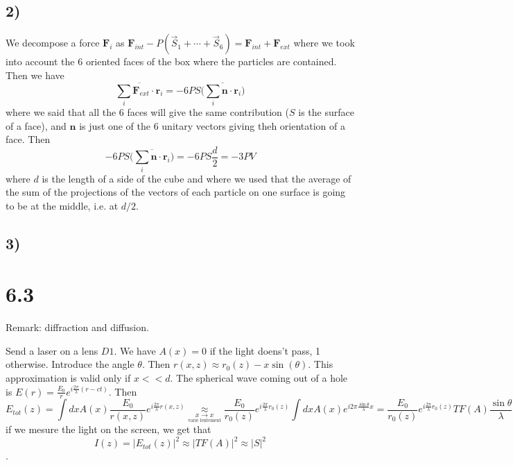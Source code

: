 \documentclass[10pt,a4paper]{book}
\begin{document}
\subsection*{2)}

We decompose a force $\mathbf{F}_i$ as $\mathbf{F}_{int}-P(\vec{S}_1+\cdots+\vec{S}_6)=\mathbf{F}_{int}+\mathbf{F}_{ext}$ where we took into account the 6 oriented faces of the box where the particles are contained. Then we have
$$\overline{\sum_i\mathbf{F}_{ext}\cdot\mathbf{r}_i}=-6PS\bigg(\overline{\sum_i \mathbf{n}\cdot \mathbf{r}_i}\bigg)$$
where we said that all the 6 faces will give the same contribution ($S$ is the surface of a face), and $\mathbf{n}$ is just one of the 6 unitary vectors giving theh orientation of a face.
Then 
$$-6PS\bigg(\overline{\sum_i \mathbf{n}\cdot \mathbf{r}_i}\bigg)=-6PS\frac{d}{2}=-3PV$$
where $d$ is the length of a side of the cube and where we used that the average of the sum of the projections of the vectors of each particle on one surface is going to be at the middle, i.e. at $d/2$.

\subsection*{3)}











\section*{6.3}




Remark: diffraction and diffusion.

Send a laser on a lens $D1$. We have $A(x)=0$ if the light doens't pass, 1 otherwise. Introduce the angle $\theta$. Then $r(x,z)\approx r_0(z)-x\sin(\theta)$. This approximation is valid only if $x<<d$. The spherical wave coming out of a hole is $E(r)=\frac{E_0}{r}e^{i\frac{2\pi}{\lambda}(r-ct)}$. Then $$E_{tot}(z)=\int dxA(x)\frac{E_0}{r(x,z)}e^{i\frac{2\pi}{\lambda}r(x,z)}\underset{\underset{\text{varie lentement}}{x\to x}}{\approx} \frac{E_0}{r_0(z)}e^{i\frac{2\pi}{\lambda}r_0(z)}\int dxA(x)e^{i2\pi\frac{\sin\theta}{\lambda}x}=\frac{E_0}{r_0(z)}e^{i\frac{2\pi}{\lambda}r_0(z)}TF(A)\frac{\sin\theta}{\lambda}$$
if we mesure the light on the screen, we get that
$$I(z)=|E_{tot}(z)|^2\approx |TF(A)|^2\approx |S|^2$$.
\end{document}
